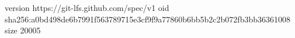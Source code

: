 version https://git-lfs.github.com/spec/v1
oid sha256:a0bd498de6b7991f563789715e3cf9f9a77860b6bb5b2c2b072fb3bb36361008
size 20005
